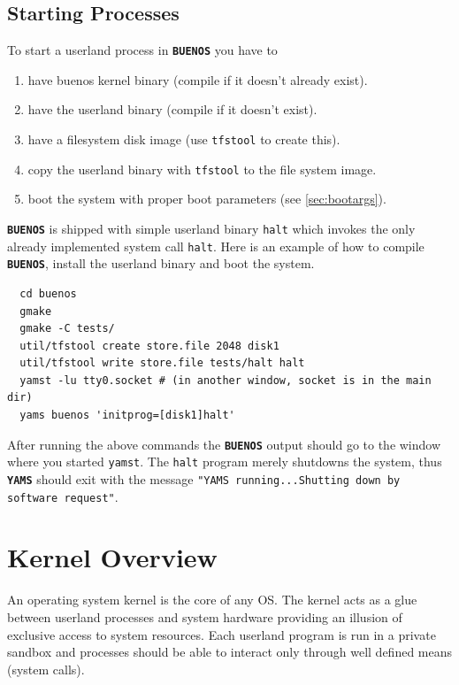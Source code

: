 \documentclass[twoside,a4paper]{report}
\newcommand{\buenos}{\texttt{\textbf{BUENOS}}}
\newcommand{\yams}{\texttt{\textbf{YAMS}}}
\begin{document}
\section{Starting Processes}

To start a userland process in \buenos{} you have to
\begin{enumerate}
\item have buenos{} kernel binary (compile if it doesn't already
  exist).
\item have the userland binary (compile if it doesn't exist).
\item have a filesystem disk image (use \texttt{tfstool} to create
  this).
\item copy the userland binary with \texttt{tfstool} to the file
  system image.
\item boot the system with proper boot parameters (see
\autoref{sec:bootargs}).
\end{enumerate}

\buenos{} is shipped with simple userland binary \texttt{halt} which
invokes the only already implemented system call \texttt{halt}. Here
is an example of how to compile \buenos{}, install the userland binary
and boot the system.

\begin{verbatim}
  cd buenos
  gmake
  gmake -C tests/
  util/tfstool create store.file 2048 disk1
  util/tfstool write store.file tests/halt halt
  yamst -lu tty0.socket # (in another window, socket is in the main dir)
  yams buenos 'initprog=[disk1]halt'
\end{verbatim}

After running the above commands the \buenos{} output should go to the
window where you started \texttt{yamst}. The \texttt{halt} program
merely shutdowns the system, thus \yams{} should exit with the message
\texttt{"YAMS running...Shutting down by software request"}.


\chapter{Kernel Overview}
\label{sec:overview}

An operating system kernel is the core of any OS. The kernel acts as
a glue between userland processes and system hardware providing an
illusion of exclusive access to system resources. Each userland
program is run in a private sandbox and processes should be able to
interact only through well defined means (system calls).
\end{document}

